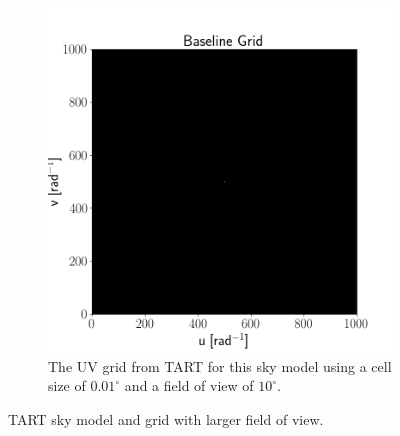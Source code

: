 \begin{figure}[H]
\begin{subfigure}[b]{0.49\textwidth}
    \includegraphics[scale=0.3]{images/TART_4_POINT_GRID_CORRECT.png}
    \caption{The UV grid from TART for this sky model using a cell size of $0.01^\circ$ and a field of view of $10^\circ$.}
    \label{fig:TART_grid_correct}
  \end{subfigure}
  \caption{TART sky model and grid with larger field of view.}
  \label{fig:TART_correct}
 \end{figure}
 
